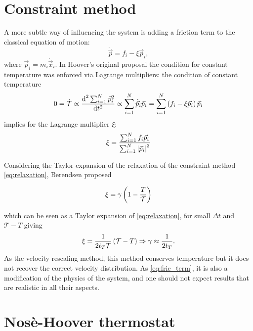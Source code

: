 \section{Constraint method}

A more subtle way of influencing the system is adding a friction term to the classical equation of motion:
\begin{equation}
\dot{\vec{p}} = f_i - \xi \vec{p}_i, 
\label{eq:fric_term}
\end{equation}
where $\vec{p}_i = m_i \dot{\vec{x}}_i$. In Hoover's original proposal the condition for constant temperature was enforced via Lagrange multipliers: the condition of constant temperature
\begin{equation*}
0=\dot{\mathcal{T}} \propto \frac{\text{d}^2 \sum_{i=1}^N {\vec{p}_i^2}}{\text{d} t ^2} \propto \sum_{i=1}^N {\dot{\vec{p}}_i\vec{p}_i} =  \sum_{i=1}^N { \left(f_i-\xi\vec{p}_i\right)  \vec{p}_i} 
\end{equation*}
implies for the Lagrange multiplier $\xi$:
\begin{equation}
\xi = \frac  {  \sum_{i=1}^N {f_i\vec{p}_i}   }  {   \sum_{i=1}^N { \left|\vec{p}_i\right|^2  }    } 
\end{equation}






Considering the Taylor expansion of the relaxation of the constraint method \eqref{eq:relaxation}, Berendsen proposed


\begin{equation}
\xi = \gamma \left(1-\frac{T}{\mathcal{T}}\right)
\end{equation}

which can be seen as a Taylor expansion of \eqref{eq:relaxation}, for small $\Delta t$ and $\mathcal{T}-T$ giving
\begin{equation*}
\xi = \frac{1}{2t_T\mathcal{T}} \left(\mathcal{T}-T\right) \Rightarrow \gamma \approx \frac{1}{2t_T}.
\end{equation*}
As the velocity rescaling method, this method conserves temperature but it does not recover the correct velocity distribution. As \eqref{eq:fric_term}, it is also a modification of the physics of the system, and one should not expect results that are realistic in all their aspects.





\section{Nos\`e-Hoover thermostat}


